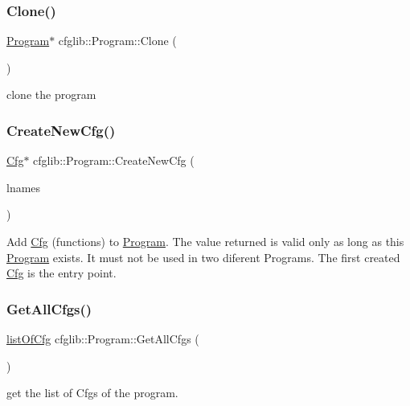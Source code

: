 \subsubsection{\texorpdfstring{Clone()}{Clone()}}
{\footnotesize\ttfamily \hyperlink{classcfglib_1_1Program}{Program}$\ast$ cfglib\+::\+Program\+::\+Clone (\begin{DoxyParamCaption}{ }\end{DoxyParamCaption})}

clone the program \mbox{\label{classcfglib_1_1Program_ac8050c9c5e4905f5e27b3071abefba82}} 
\subsubsection{\texorpdfstring{Create\+New\+Cfg()}{CreateNewCfg()}}
{\footnotesize\ttfamily \hyperlink{classcfglib_1_1Cfg}{Cfg}$\ast$ cfglib\+::\+Program\+::\+Create\+New\+Cfg (\begin{DoxyParamCaption}\item[{List\+Of\+String const \&}]{lnames }\end{DoxyParamCaption})}

Add \hyperlink{classcfglib_1_1Cfg}{Cfg} (functions) to \hyperlink{classcfglib_1_1Program}{Program}. The value returned is valid only as long as this \hyperlink{classcfglib_1_1Program}{Program} exists. It must not be used in two diferent Programs. The first created \hyperlink{classcfglib_1_1Cfg}{Cfg} is the entry point. \mbox{\label{classcfglib_1_1Program_a12869527820e336393106010b15ac419}} 
\subsubsection{\texorpdfstring{Get\+All\+Cfgs()}{GetAllCfgs()}}
{\footnotesize\ttfamily \hyperlink{namespacecfglib_a6d40ca49d73d6bd01cf38af88645373a}{list\+Of\+Cfg} cfglib\+::\+Program\+::\+Get\+All\+Cfgs (\begin{DoxyParamCaption}{ }\end{DoxyParamCaption})}

get the list of Cfgs of the program. \mbox{\label{classcfglib_1_1Program_a78a1fa44a467ae9e897aea3710f7e931}} 
